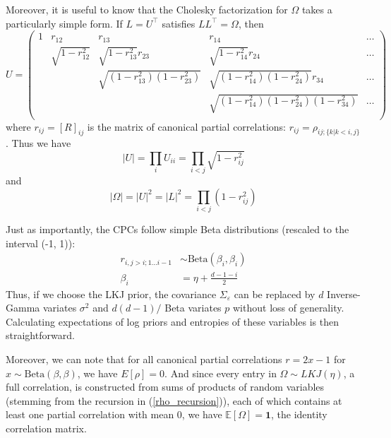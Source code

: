\documentclass[11pt]{article}
\begin{document}
Moreover, it is useful to know that the Cholesky factorization for $\Omega$ takes a particularly simple form. If $L = U^\top$ satisfies $LL^\top = \Omega$, then
\begin{equation}
    U =
    \begin{pmatrix}
    1 & r_{12} & r_{13} & r_{14} & \ldots \\
    & \sqrt{1 - r_{12}^2} & \sqrt{1 - r_{13}^2}r_{23} & \sqrt{1 - r_{14}^2}r_{24} & \ldots \\
    && \sqrt{(1 - r_{13}^2)(1 - r_{23}^2)} & \sqrt{(1 - r_{14}^2)(1 - r_{24}^2)}r_{34} & \ldots \\
    &&& \sqrt{(1 - r_{14}^2)(1 - r_{24}^2)(1 - r_{34}^2)} & \ldots \\
    \end{pmatrix}
\end{equation}
where $r_{ij} = [R]_{ij}$ is the matrix of canonical partial correlations: $r_{ij} = \rho_{ij;\lbrace k | k < i,j\rbrace}$. Thus we have
\begin{equation}
    |U| = \prod_i U_{ii} = \prod_{i < j} \sqrt{1 - r_{ij}^2}
\end{equation}
and
\begin{equation}
    \label{det_omega}
    |\Omega| = |U|^2 = |L|^2 = \prod_{i < j} (1 - r_{ij}^2)
\end{equation}

Just as importantly, the CPCs follow simple Beta distributions (rescaled to the interval (-1, 1)):
\begin{align}
    r_{i,j > i;1\ldots i - 1} &\sim \mathrm{Beta}(\beta_{i}, \beta_{i}) \\
    \beta_i &= \eta + \frac{d - 1 - i}{2}
\end{align}
Thus, if we choose the LKJ prior, the covariance $\Sigma_\varepsilon$ can be replaced by $d$ Inverse-Gamma variates $\sigma^2$ and $d(d-1)/$ Beta variates $p$ without loss of generality. Calculating expectations of log priors and entropies of these variables is then straightforward.

Moreover, we can note that for all canonical partial correlations $r = 2x - 1$ for $x \sim \mathrm{Beta}(\beta, \beta)$, we have $E[\rho] = 0$. And since every entry in $\Omega \sim LKJ(\eta)$, a full correlation, is constructed from sums of products of random variables (stemming from the recursion in (\ref{rho_recursion})), each of which contains at least one partial correlation with mean 0, we have $\mathbb{E}[\Omega] = \mathbf{1}$, the identity correlation matrix.
\end{document}
